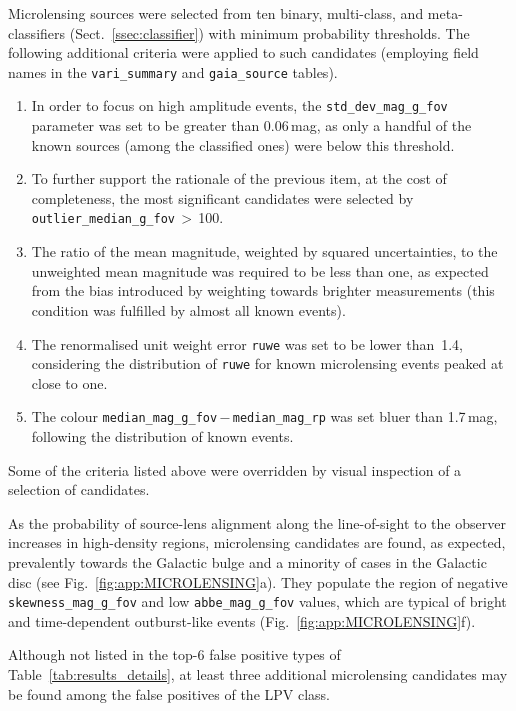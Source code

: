 \documentclass[longauth]{aa}
\begin{document}
Microlensing sources were selected from ten binary, multi-class, and meta-classifiers (Sect.~\ref{ssec:classifier}) with minimum probability thresholds. The following additional criteria were applied to such candidates (employing field names in the \texttt{vari\_summary} and \texttt{gaia\_source} tables).
\begin{enumerate}
    \item In order to focus on high amplitude events, the \texttt{std\_dev\_mag\_g\_fov} parameter was set to be greater than 0.06\,mag, as only a handful of the known sources (among the classified ones) were below this threshold.
    \item To further support the rationale of the previous item, at the cost of completeness, the most significant candidates were selected by \texttt{outlier\_median\_g\_fov}\,$>$\,100.
    \item The ratio of the mean magnitude, weighted by squared uncertainties, to the unweighted mean magnitude was required to be less than one, as expected from the bias introduced by weighting towards brighter measurements (this condition was fulfilled by almost all known events).
    \item The renormalised unit weight error \texttt{ruwe} was set to be lower than~1.4, considering the distribution of \texttt{ruwe} for known microlensing events peaked at close to one.
    \item The colour \texttt{median\_mag\_g\_fov}\,$-$\,\texttt{median\_mag\_rp} was set bluer than 1.7\,mag, following the distribution of known events. 
\end{enumerate}
Some of the criteria listed above were overridden by visual inspection of a selection of candidates.

As the probability of source-lens alignment along the line-of-sight to the observer increases in high-density regions, microlensing candidates are found, as expected,  prevalently towards the Galactic bulge and a minority of cases in the Galactic disc (see Fig.~\ref{fig:app:MICROLENSING}a). They populate the region of negative \texttt{skewness\_mag\_g\_fov} and low \texttt{abbe\_mag\_g\_fov} values, which  are typical of bright and time-dependent outburst-like events (Fig.~\ref{fig:app:MICROLENSING}f).

Although not listed in the top-6 false positive types of Table~\ref{tab:results_details}, at least three additional microlensing candidates may be found among the false positives of the LPV class.

\end{document}
